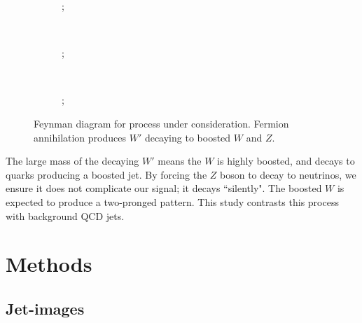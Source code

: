 \documentclass[twocolumn]{article}
\begin{document}
	\begin{figure}[]
		\centering
		\begin{subfigure}[t]{1.0\columnwidth}
			\centering
			;
		\end{subfigure}%
		\\ 
		\begin{subfigure}[t]{0.45\columnwidth}
			\centering
			;
		\end{subfigure}
		~
		\begin{subfigure}[t]{0.45\columnwidth}
			\centering
			;
		\end{subfigure}
	\caption{Feynman diagram for process under consideration. Fermion annihilation produces $W'$ decaying to boosted $W$ and $Z$.}
	\label{fig:feynmans}
	\end{figure}

The large mass of the decaying $W'$ means the $W$ is highly boosted, and decays to quarks producing a boosted jet. By forcing the $Z$  boson to decay to neutrinos, we ensure it does not complicate our signal; it decays ``silently". The boosted $W$ is expected to produce a two-pronged pattern. This study contrasts this process with background QCD jets.
 





\section{Methods}
\label{sec:methods}

\subsection{Jet-images}
\end{document}

